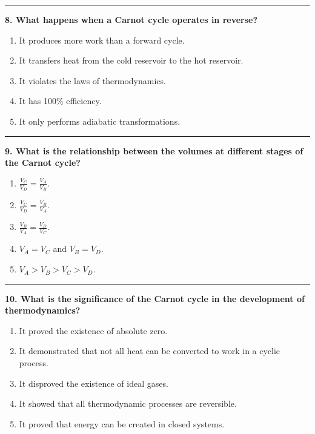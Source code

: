 \documentclass[
  9pt,
]{extbook}
\providecommand{\tightlist}{%
  \setlength{\itemsep}{0pt}\setlength{\parskip}{0pt}}
\theoremstyle{definition}
\theoremstyle{definition}
\theoremstyle{definition}
\theoremstyle{remark}
\begin{document}
\begin{center}\rule{0.5\linewidth}{0.5pt}\end{center}

\textbf{8. What happens when a Carnot cycle operates in reverse?}

\begin{enumerate}
\def\labelenumi{\alph{enumi}.}
\tightlist
\item
  It produces more work than a forward cycle.
\item
  It transfers heat from the cold reservoir to the hot reservoir.
\item
  It violates the laws of thermodynamics.
\item
  It has 100\% efficiency.
\item
  It only performs adiabatic transformations.
\end{enumerate}

\begin{center}\rule{0.5\linewidth}{0.5pt}\end{center}

\textbf{9. What is the relationship between the volumes at different stages of the Carnot cycle?}

\begin{enumerate}
\def\labelenumi{\alph{enumi}.}
\tightlist
\item
  \(\frac{V_C}{V_D} = \frac{V_A}{V_B}\).
\item
  \(\frac{V_C}{V_D} = \frac{V_B}{V_A}\).
\item
  \(\frac{V_B}{V_A} = \frac{V_D}{V_C}\).
\item
  \(V_A = V_C\) and \(V_B = V_D\).
\item
  \(V_A > V_B > V_C > V_D\).
\end{enumerate}

\begin{center}\rule{0.5\linewidth}{0.5pt}\end{center}

\textbf{10. What is the significance of the Carnot cycle in the development of thermodynamics?}

\begin{enumerate}
\def\labelenumi{\alph{enumi}.}
\tightlist
\item
  It proved the existence of absolute zero.
\item
  It demonstrated that not all heat can be converted to work in a cyclic process.
\item
  It disproved the existence of ideal gases.
\item
  It showed that all thermodynamic processes are reversible.
\item
  It proved that energy can be created in closed systems.
\end{enumerate}
\end{document}
